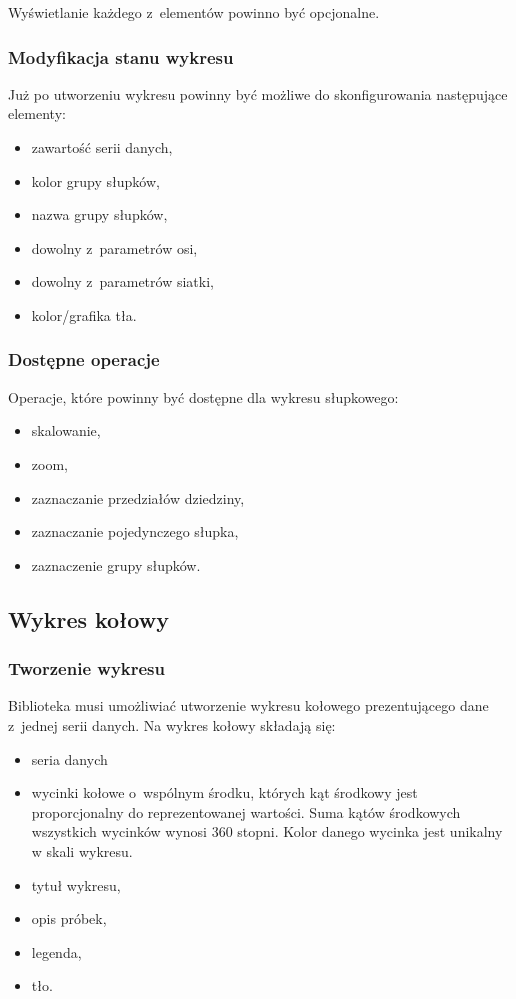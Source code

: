 \documentclass[11pt,twoside,a4paper,final]{article}
\begin{document}
Wyświetlanie każdego z~elementów powinno być opcjonalne. 
\subsubsection{Modyfikacja stanu wykresu}
Już po utworzeniu wykresu powinny być możliwe do skonfigurowania następujące elementy:
\begin{itemize}
\item{zawartość serii danych,}
\item{kolor grupy słupków,}
\item{nazwa grupy słupków,}
\item{dowolny z~parametrów osi,}
\item{dowolny z~parametrów siatki,}
\item{kolor/grafika tła.}
\end{itemize}

\subsubsection{Dostępne operacje}
Operacje, które powinny być dostępne dla wykresu słupkowego:
\begin{itemize}
\item{skalowanie,}
\item{zoom,}
\item{zaznaczanie przedziałów dziedziny,}
\item{zaznaczanie pojedynczego słupka,}
\item{zaznaczenie grupy słupków.}
\end{itemize}


\subsection{Wykres kołowy}
\subsubsection{Tworzenie wykresu}
Biblioteka musi umożliwiać utworzenie wykresu kołowego prezentującego dane z~jednej serii danych. Na wykres kołowy składają się:
\begin{itemize}
\item{seria danych}
\item{wycinki kołowe o~wspólnym środku, których kąt środkowy jest proporcjonalny do reprezentowanej wartości. Suma kątów środkowych wszystkich wycinków wynosi 360 stopni. Kolor danego wycinka jest unikalny w skali wykresu.}
\item{tytuł wykresu,}
\item{opis próbek,}
\item{legenda,}
\item{tło.}
\end{itemize}
\end{document}
